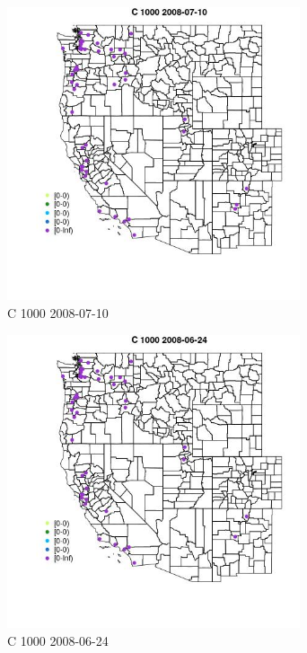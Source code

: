 \begin{figure} 
\centering  
\includegraphics[width=0.77\textwidth]{Code_Outputs/Report_ML_input_PM25_Step4_part_e_de_duplicated_aves_MapObsC_10002008-07-10.jpg} 
\caption{\label{fig:Report_ML_input_PM25_Step4_part_e_de_duplicated_avesMapObsC_10002008-07-10}C 1000 2008-07-10} 
\end{figure} 
 

\begin{figure} 
\centering  
\includegraphics[width=0.77\textwidth]{Code_Outputs/Report_ML_input_PM25_Step4_part_e_de_duplicated_aves_MapObsC_10002008-06-24.jpg} 
\caption{\label{fig:Report_ML_input_PM25_Step4_part_e_de_duplicated_avesMapObsC_10002008-06-24}C 1000 2008-06-24} 
\end{figure} 
 

